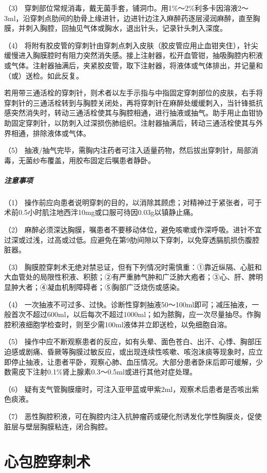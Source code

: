（3）
穿刺部位常规消毒，戴无菌手套，铺洞巾。用1\%～2\%利多卡因溶液2～3ml，沿穿刺点肋间的肋骨上缘进针，边进针边注入麻醉药逐层浸润麻醉，直至胸膜，并刺入胸腔，回抽见气体或胸水，退出针头，记录针头刺入深度。

（4）
将附有胶皮管的穿刺针由穿刺点刺入皮肤（胶皮管应用止血钳夹住），针尖缓慢进入胸膜腔时有阻力突然消失感。接上注射器，松开血管钳，抽吸胸腔内积液或气体。注射器抽满后，夹紧胶皮管，取下注射器，将液体或气体排出，并记量和（或）送检。如此反复。

若用带三通活栓的穿刺针，则术者以左手示指与中指固定穿刺部位的皮肤，右手将穿刺针的三通活栓转到与胸腔关闭处，再将穿刺针在麻醉处缓缓刺入，当针锋抵抗感突然消失时，转动三通活栓使其与胸腔相通，进行抽液或抽气。助手用止血钳协助固定穿刺针，以防刺入过深损伤肺组织。注射器抽满后，转动三通活栓使其与外界相通，排除液体或气体。

（5）
抽液/抽气完毕，需胸内注药者可注入适量药物，然后拔出穿刺针，局部消毒，无菌纱布覆盖，用胶布固定后嘱患者静卧。

\subparagraph{注意事项}

（1）
操作前应向患者说明穿刺的目的，以消除其顾虑；对精神过于紧张者，可于术前0.5小时肌注地西泮10mg或口服可待因0.03g以镇静止痛。

（2）
麻醉必须深达胸膜，嘱患者不要移动体位，避免咳嗽或作深呼吸。进针不宜过深或过浅，过高或过低。应避免在第9肋间隙以下穿刺，以免穿透膈肌损伤腹腔脏器。

（3）
胸膜腔穿刺术无绝对禁忌证，但有下列情况时需慎重：①靠近纵隔、心脏和大血管处的局限性积液、积脓；②有严重肺气肿和广泛肺大疱者；③心、肝、脾明显肿大者；④凝血机制障碍者；⑤胸部广泛烧伤或感染。

（4）
一次抽液不可过多、过快。诊断性穿刺抽液50～100ml即可；减压抽液，一般首次不超过600ml，以后每次不超过1000ml；如为脓胸，应一次尽量抽尽。作胸腔积液细胞学检查时，则至少需100ml液体并立即送检，以免细胞自溶。

（5）
操作中应不断观察患者的反应，如有头晕、面色苍白、出汗、心悸、胸部压迫感或剧痛、昏厥等胸膜过敏反应，或出现连续性咳嗽、咳泡沫痰等现象时，应立即停止抽液，让患者平卧，观察心肺、血压情况。大部分患者卧床后即可缓解，少数需皮下注射0.1\%肾上腺素0.3～0.5ml或进行其他对症处理。

（6）
疑有支气管胸膜瘘时，可注入亚甲蓝或甲紫2ml，观察术后患者是否咳出紫色痰液。

（7）
恶性胸腔积液，可在胸腔内注入抗肿瘤药或硬化剂诱发化学性胸膜炎，促使脏层与壁层胸膜粘连，闭合胸腔。

\protect\hypertarget{text00383.html}{}{}

\section{心包腔穿刺术}

